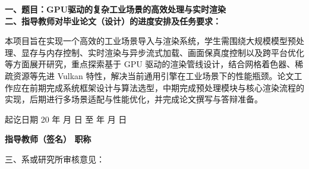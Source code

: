\cleardoublepage{}

{
    \bfseries
    \noindent 一、题目：GPU驱动的复杂工业场景的高效处理与实时渲染\\
    \noindent 二、指导教师对毕业论文（设计）的进度安排及任务要求：\\

    \mdseries

    本项目旨在实现一个高效的工业场景导入与渲染系统，学生需围绕大规模模型预处理、显存与内存控制、实时渲染与异步流式加载、画面保真度控制以及跨平台优化等方面展开研究，重点探索基于 GPU 驱动的渲染管线设计，结合网格着色器、稀疏资源等先进 Vulkan 特性，解决当前通用引擎在工业场景下的性能瓶颈。论文工作应在前期完成系统框架设计与算法选型，中期完成预处理模块与核心渲染流程的实现，后期进行多场景适配与性能优化，并完成论文撰写与答辩准备。

    \vskip 40mm

    \bfseries

    \noindent 起讫日期 20 \quad 年 \quad  月 \quad  日 \quad 至  \quad  年 \quad  月  \quad 日
    \begin{flushright}
        \bfseries {}
            指导教师（签名） \underline{} 职称 \underline{}
    \end{flushright}

    \noindent 三、系或研究所审核意见：\\

    \mbox{} \vfill
    \signature{负责人（签名）}
}
